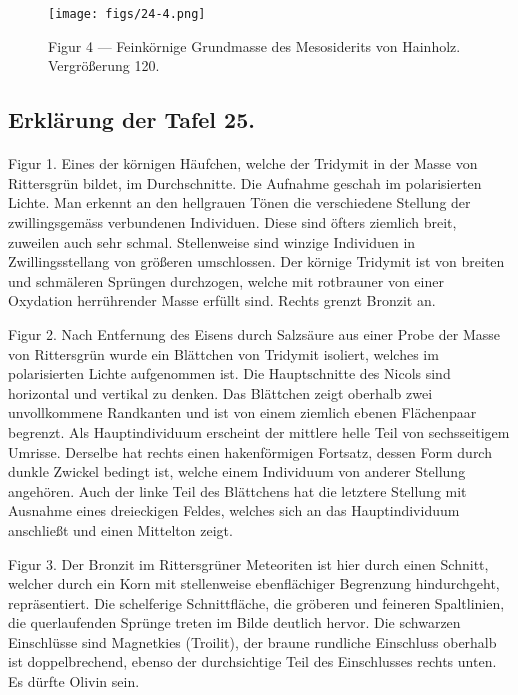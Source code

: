 \documentclass[a4paper, 12pt, oneside]{article}
\begin{document}
\vspace*{\fill}
\begin{figure}[H]
\centering
\texttt{[image: figs/24-4.png]}
\caption{\small Figur 4 --- Feinkörnige Grundmasse des Mesosiderits von Hainholz. Vergrößerung 120.}
\end{figure}
\vspace*{\fill}
\clearpage

\subsection{Erklärung der Tafel 25.}
\paragraph{}
Figur 1. Eines der körnigen Häufchen, welche der Tridymit in der Masse von Rittersgrün bildet, im Durchschnitte. Die Aufnahme geschah im polarisierten Lichte. Man erkennt an den hellgrauen Tönen die verschiedene Stellung der zwillingsgemäss verbundenen Individuen. Diese sind öfters ziemlich breit, zuweilen auch sehr schmal. Stellenweise sind winzige Individuen in Zwillingsstellang von größeren umschlossen. Der körnige Tridymit ist von breiten und schmäleren Sprüngen durchzogen, welche mit rotbrauner von einer Oxydation herrührender Masse erfüllt sind. Rechts grenzt Bronzit an.

Figur 2. Nach Entfernung des Eisens durch Salzsäure aus einer Probe der Masse von Rittersgrün wurde ein Blättchen von Tridymit isoliert, welches im polarisierten Lichte aufgenommen ist. Die Hauptschnitte des Nicols sind horizontal und vertikal zu denken. Das Blättchen zeigt oberhalb zwei unvollkommene Randkanten und ist von einem ziemlich ebenen Flächenpaar begrenzt. Als Hauptindividuum erscheint der mittlere helle Teil von sechsseitigem Umrisse. Derselbe hat rechts einen hakenförmigen Fortsatz, dessen Form durch dunkle Zwickel bedingt ist, welche einem Individuum von anderer Stellung angehören. Auch der linke Teil des Blättchens hat die letztere Stellung mit Ausnahme eines dreieckigen Feldes, welches sich an das Hauptindividuum anschließt und einen Mittelton zeigt.

Figur 3. Der Bronzit im Rittersgrüner Meteoriten ist hier durch einen Schnitt, welcher durch ein Korn mit stellenweise ebenflächiger Begrenzung hindurchgeht, repräsentiert. Die schelferige Schnittfläche, die gröberen und feineren Spaltlinien, die querlaufenden Sprünge treten im Bilde deutlich hervor. Die schwarzen Einschlüsse sind Magnetkies (Troilit), der braune rundliche Einschluss oberhalb ist doppelbrechend, ebenso der durchsichtige Teil des Einschlusses rechts unten. Es dürfte Olivin sein.
\end{document}
